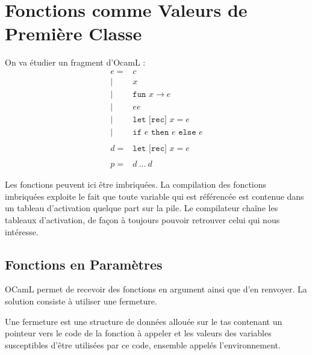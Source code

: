 \documentclass{cours}
\begin{document}
\section{Fonctions comme Valeurs de Première Classe}
On va étudier un fragment d'OcamL :
\[
    \begin{aligned}
        e =  & c                                                  \\
        \mid & x                                                  \\
        \mid & \texttt{fun } x \rightarrow e                      \\
        \mid & e e                                                \\
        \mid & \texttt{let [rec] } x = e                          \\
        \mid & \texttt{if } e \texttt{ then } e \texttt{ else } e \\
             &                                                    \\
        d =  & \texttt{let [rec] } x = e                          \\
             &                                                    \\
        p =  & d \ \ldots \ d
    \end{aligned}
\]
\begin{remark}
    Les fonctions peuvent ici être imbriquées. La compilation des fonctions imbriquées exploite le fait que toute variable qui est référencée est contenue dans un tableau d'activation quelque part sur la pile. Le compilateur chaîne les tableaux d'activation, de façon à toujours pouvoir retrouver celui qui nous intéresse.\\
\end{remark}

\subsection{Fonctions en Paramètres}
OCamL permet de recevoir des fonctions en argument ainsi que d'en renvoyer. La solution consiste à utiliser une fermeture.
\begin{definition}
    Une fermeture est une structure de données allouée sur le tas contenant un pointeur vers le code de la fonction à appeler et les valeurs des variables susceptibles d'être utilisées par ce code, ensemble appelés l'environnement.
\end{definition}
\end{document}
